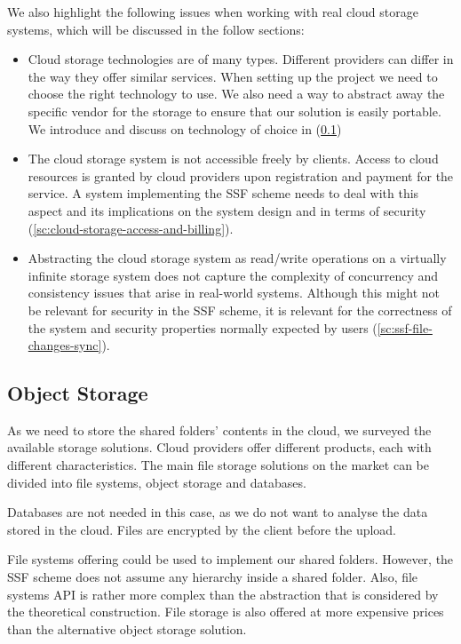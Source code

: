 We also highlight the following issues when working with
real cloud storage systems, which will be discussed in the
follow sections:
\begin{itemize}
    \item Cloud storage technologies are of many types.
    Different providers can differ in the way they
    offer similar services.
    When setting up the project we need to choose the right
    technology to use. We also need a way to
    abstract away the specific vendor for the storage
    to ensure that our solution is easily portable.
    We introduce and discuss on technology of choice in (\cref{ssc:object-storage})
    \item The cloud storage system is not accessible freely
    by clients. Access to cloud resources is
    granted by cloud providers upon registration and payment
    for the service. A system implementing the SSF scheme
    needs to deal with this aspect and its implications
    on the system design and in terms of security (\cref{sc:cloud-storage-access-and-billing}).
    \item Abstracting the cloud storage system as read/write
    operations on a virtually infinite storage system does
    not capture the complexity of concurrency and consistency
    issues that arise in real-world systems. Although this
    might not be relevant for security in the SSF scheme,
    it is relevant for the correctness of the system and
    security properties normally expected by users (\cref{sc:ssf-file-changes-sync}).
\end{itemize}

\subsection{Object Storage}\label{ssc:object-storage}
As we need to store the shared folders' contents in the cloud,
we surveyed the available storage solutions.
Cloud providers offer different products,
each with different characteristics. The main file
storage solutions on the market can be divided into
file systems, object storage and databases.

Databases are not needed in this case,
as we do not want to analyse the data stored in
the cloud. Files are encrypted by the client
before the upload.

File systems offering could be used to implement
our shared folders. However, the SSF scheme does not
assume any hierarchy inside a shared folder.
Also, file systems API is rather more complex
than the abstraction that is considered by the
theoretical construction. File storage is also offered
at more expensive prices than the alternative object storage solution.

